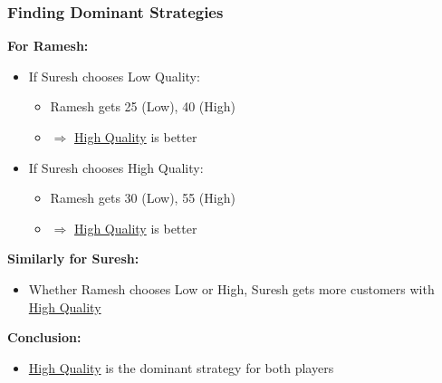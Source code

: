 \begin{frame}[fragile]\frametitle{Finding Dominant Strategies}

\textbf{For Ramesh:}

\begin{itemize}
  \item If Suresh chooses Low Quality:
  \begin{itemize}
    \item Ramesh gets 25 (Low), 40 (High)
    \item $\Rightarrow$ \underline{High Quality} is better
  \end{itemize}
  
  \item If Suresh chooses High Quality:
  \begin{itemize}
    \item Ramesh gets 30 (Low), 55 (High)
    \item $\Rightarrow$ \underline{High Quality} is better
  \end{itemize}
\end{itemize}

\vspace{6pt}

\textbf{Similarly for Suresh:}

\begin{itemize}
  \item Whether Ramesh chooses Low or High, Suresh gets more customers with \underline{High Quality}
\end{itemize}

\vspace{8pt}

\textbf{Conclusion:}
\begin{itemize}
  \item \underline{High Quality} is the dominant strategy for both players
\end{itemize}

\end{frame}

